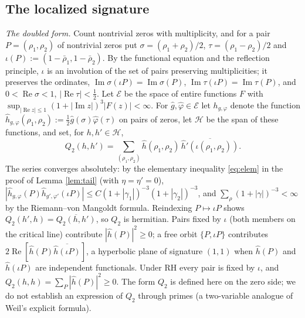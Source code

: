 \documentclass[11pt,reqno]{amsart}
\theoremstyle{definition}
\newcommand{\half}{\tfrac12}
\begin{document}
\subsection{The localized signature}

\emph{The doubled form.} Count nontrivial zeros with multiplicity, and for a pair
\(P=(\rho_1,\rho_2)\) of nontrivial zeros put \(\sigma=(\rho_1+\rho_2)/2\),
\(\tau=(\rho_1-\rho_2)/2\) and \(\iota(P):=(1-\bar\rho_1,1-\bar\rho_2)\). By
the functional equation and the reflection principle, \(\iota\) is an
involution of the set of pairs preserving multiplicities; it preserves the
ordinates, \(\operatorname{Im}\sigma(\iota P)=\operatorname{Im}\sigma(P)\),
\(\operatorname{Im}\tau(\iota P)=\operatorname{Im}\tau(P)\), and
\(0<\operatorname{Re}\sigma<1\), \(|\operatorname{Re}\tau|<\half\). Let
\(\mathcal E\) be the space of entire functions \(F\) with
\(\sup_{|\operatorname{Re}z|\leq1}(1+|\operatorname{Im}z|)^3|F(z)|<\infty\).
For \(\hat g,\hat\varphi\in\mathcal E\) let \(h_{g,\varphi}\) denote the
function \(\hat h_{g,\varphi}(\rho_1,\rho_2):=\half\hat g(\sigma)\hat\varphi(\tau)\)
on pairs of zeros, let \(\mathcal H\) be the span of these functions, and set,
for \(h,h'\in\mathcal H\),
\begin{equation}\label{eq:speca}
Q_2(h,h')=\sum_{(\rho_1,\rho_2)}\hat h(\rho_1,\rho_2)\,
\overline{\hat h'(\iota(\rho_1,\rho_2))} .
\end{equation}
The series converges absolutely: by the elementary inequality
\eqref{eq:elem} in the proof of Lemma \ref{lem:tail} (with \(\eta=\eta'=0\)),
\(|\hat h_{g,\varphi}(P)\hat h_{g',\varphi'}(\iota P)|\leq
C(1+|\gamma_1|)^{-3}(1+|\gamma_2|)^{-3}\), and
\(\sum_\rho(1+|\gamma|)^{-3}<\infty\) by the Riemann--von Mangoldt formula.
Reindexing \(P\mapsto\iota P\) shows \(Q_2(h',h)=\overline{Q_2(h,h')}\), so
\(Q_2\) is hermitian. Pairs fixed by \(\iota\) (both members on the critical
line) contribute \(|\hat h(P)|^2\geq0\); a free orbit \(\{P,\iota P\}\)
contributes \(2\operatorname{Re}[\hat h(P)\overline{\hat h(\iota P)}]\), a
hyperbolic plane of signature \((1,1)\) when \(\hat h(P)\) and
\(\hat h(\iota P)\) are independent functionals. Under RH every pair is fixed by
\(\iota\), and \(Q_2(h,h)=\sum_P|\hat h(P)|^2\geq0\). The form \(Q_2\) is
defined here on the zero side; we do not establish an expression of \(Q_2\)
through primes (a two-variable analogue of Weil's explicit formula).
\end{document}

